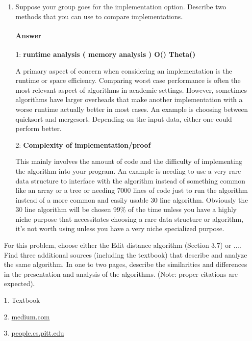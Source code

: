 \documentclass{article}
\begin{document}
\begin{enumerate}
    \item Suppose your group goes for the implementation option. Describe two
        methods that you can use to compare implementations.

        \paragraph{Answer}
    1: {\bf runtime analysis ( memory analysis ) O() Theta()}

A primary aspect of concern when considering an implementation is the runtime or space efficiency. Comparing worst case performance is often the most relevant aspect of algorithms in academic settings. However, sometimes algorithms have larger overheads that make another implementation with a worse runtime actually better in most cases. An example is choosing between quicksort and mergesort. Depending on the input data, either one could perform better.

    2: {\bf Complexity of implementation/proof}

This mainly involves the amount of code and the difficulty of implementing the algorithm into your program. An example is needing to use a very rare data structure to interface with the algorithm instead of something common like an array or a tree or needing 7000 lines of code just to run the algorithm instead of a more common and easily usable 30 line algorithm. Obviously the 30 line algorithm will be chosen 99\% of the time unless you have a highly niche purpose that necessitates choosing a rare data structure or algorithm, it's not worth using unless you have a very niche specialized purpose.

\end{enumerate}



For this problem, choose either the Edit distance algorithm (Section 3.7) or ....
Find three additional sources (including the
textbook) that describe
and analyze the same algorithm. In one to two pages, describe the similarities
and differences in the presentation and analysis of the algorithms. (Note:
proper citations are expected).

1. Textbook

2. \href{https://medium.com/@ethannam/understanding-the-levenshtein-distance-equation-for-beginners-c4285a5604f0}{medium.com}

3. \href{https://people.cs.pitt.edu/~kirk/cs1501/Pruhs/Spring2006/assignments/editdistance/Levenshtein%20Distance.htm}{people.cs.pitt.edu}
\end{document}
